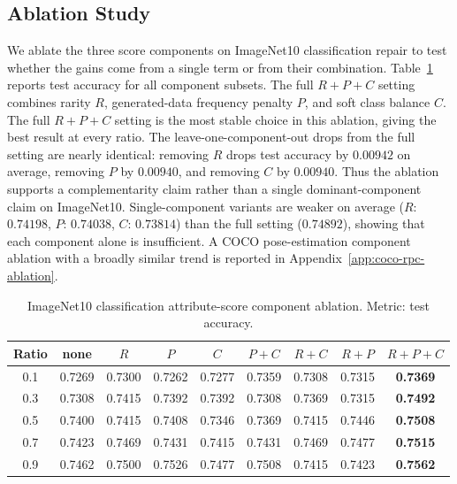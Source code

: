 \documentclass{article}
\begin{document}
\subsection{Ablation Study}

We ablate the three score components on ImageNet10 classification repair to test whether the gains come from a single term or from their combination. Table~\ref{tab:imagenet-rpc-ablation} reports test accuracy for all component subsets. The full $R+P+C$ setting combines rarity $R$, generated-data frequency penalty $P$, and soft class balance $C$. The full $R+P+C$ setting is the most stable choice in this ablation, giving the best result at every ratio. The leave-one-component-out drops from the full setting are nearly identical: removing $R$ drops test accuracy by $0.00942$ on average, removing $P$ by $0.00940$, and removing $C$ by $0.00940$. Thus the ablation supports a complementarity claim rather than a single dominant-component claim on ImageNet10. Single-component variants are weaker on average ($R$: $0.74198$, $P$: $0.74038$, $C$: $0.73814$) than the full setting ($0.74892$), showing that each component alone is insufficient. A COCO pose-estimation component ablation with a broadly similar trend is reported in Appendix~\ref{app:coco-rpc-ablation}.

\begin{table}[t]
\centering
\caption{ImageNet10 classification attribute-score component ablation. Metric: test accuracy.}
\label{tab:imagenet-rpc-ablation}
\footnotesize
\setlength{\tabcolsep}{4pt}
\begin{tabular}{c c c c c c c c c}
\toprule
Ratio & none & $R$ & $P$ & $C$ & $P+C$ & $R+C$ & $R+P$ & $R+P+C$ \\
\midrule
0.1 & 0.7269 & 0.7300 & 0.7262 & 0.7277 & 0.7359 & 0.7308 & 0.7315 & \textbf{0.7369} \\
0.3 & 0.7308 & 0.7415 & 0.7392 & 0.7392 & 0.7308 & 0.7369 & 0.7315 & \textbf{0.7492} \\
0.5 & 0.7400 & 0.7415 & 0.7408 & 0.7346 & 0.7369 & 0.7415 & 0.7446 & \textbf{0.7508} \\
0.7 & 0.7423 & 0.7469 & 0.7431 & 0.7415 & 0.7431 & 0.7469 & 0.7477 & \textbf{0.7515} \\
0.9 & 0.7462 & 0.7500 & 0.7526 & 0.7477 & 0.7508 & 0.7415 & 0.7423 & \textbf{0.7562} \\
\bottomrule
\end{tabular}
\end{table}
\end{document}

